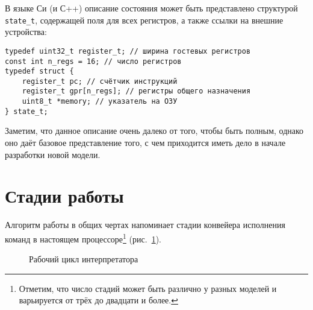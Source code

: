 В языке Си (и С++) описание состояния может быть представлено структурой \texttt{state_t}, содержащей поля для всех регистров, а также ссылки на внешние устройства:

\begin{lstlisting}
typedef uint32_t register_t; // ширина гостевых регистров
const int n_regs = 16; // число регистров
typedef struct {
    register_t pc; // счётчик инструкций
    register_t gpr[n_regs]; // регистры общего назначения
    uint8_t *memory; // указатель на ОЗУ
} state_t;
\end{lstlisting}

Заметим, что данное описание очень далеко от того, чтобы быть полным, однако оно даёт базовое представление того, с чем приходится иметь дело в начале разработки новой модели.

\section{Стадии работы}
Алгоритм работы в общих чертах напоминает стадии конвейера исполнения команд в настоящем процессоре\footnote{Отметим, что число  стадий может быть различно у разных моделей и варьируется от трёх до двадцати и более.} (рис.~\ref{fig:interp-cycle-expanded}). 

\begin{figure}[htb]
    \centering
    \caption{Рабочий цикл интерпретатора}
    \label{fig:interp-cycle-expanded}
\end{figure}


